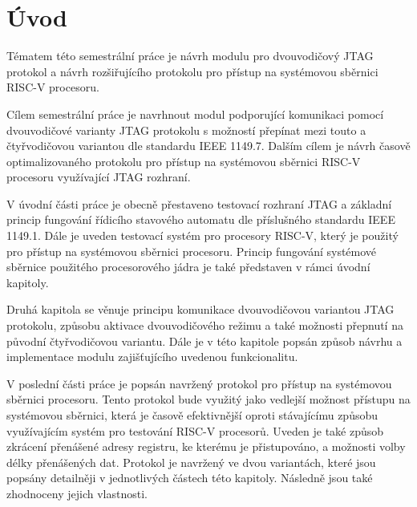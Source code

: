\chapter*{Úvod}
{}

Tématem této semestrální práce je návrh modulu pro dvouvodičový \acs{JTAG} protokol a návrh rozšiřujícího protokolu pro přístup na systémovou sběrnici \acs{RISC-V} procesoru.

Cílem semestrální práce je navrhnout modul podporující komunikaci pomocí dvouvodičové varianty \acs{JTAG} protokolu s možností přepínat mezi touto a čtyřvodičovou variantou dle standardu IEEE 1149.7. Dalším cílem je návrh časově optimalizovaného protokolu pro přístup na systémovou sběrnici \acs{RISC-V} procesoru využívající \acs{JTAG} rozhraní.

V úvodní části práce je obecně přestaveno testovací rozhraní \acs{JTAG} a základní princip fungování řídicího stavového automatu dle příslušného standardu IEEE 1149.1. Dále je uveden testovací systém pro procesory \acs{RISC-V}, který je použitý pro přístup na systémovou sběrnici procesoru. Princip fungování systémové sběrnice použitého procesorového jádra je také představen v rámci úvodní kapitoly.

Druhá kapitola se věnuje principu komunikace dvouvodičovou variantou \acs{JTAG} protokolu, způsobu aktivace dvouvodičového režimu a také možnosti přepnutí na původní čtyřvodičovou variantu. Dále je v této kapitole popsán způsob návrhu a implementace modulu zajišťujícího uvedenou funkcionalitu.

V poslední části práce je popsán navržený protokol pro přístup na systémovou sběrnici procesoru. Tento protokol bude využitý jako vedlejší možnost přístupu na systémovou sběrnici, která je časově efektivnější oproti stávajícímu způsobu využívajícím systém pro testování \acs{RISC-V} procesorů. Uveden je také způsob zkrácení přenášené adresy registru, ke kterému je přistupováno, a možnosti volby délky přenášených dat. Protokol je navržený ve dvou variantách, které jsou popsány detailněji v jednotlivých částech této kapitoly. Následně jsou také zhodnoceny jejich vlastnosti.

